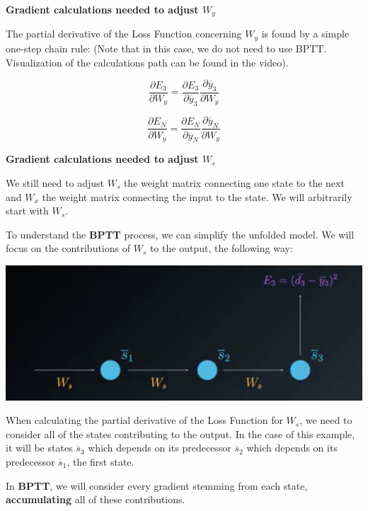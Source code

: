 \textbf{Gradient calculations needed to adjust \(W_y\)} \newline

The partial derivative of the Loss Function concerning \(W_y\) is found by a simple one-step chain rule: (Note that in this case, we do not need to use BPTT. Visualization of the calculations path can be found in the video).

\[\frac{\partial E_3}{\partial W_y} = \frac{\partial E_3}{\partial \overline{y}_3} \frac{\partial \overline{y}_3}{\partial W_y}\]

\[\frac{\partial E_N}{\partial W_y} = \frac{\partial E_N}{\partial \overline{y}_N} \frac{\partial \overline{y}_N}{\partial W_y}\]

\textbf{Gradient calculations needed to adjust \(W_s\)} \newline

We still need to adjust \(W_s\) the weight matrix connecting one state to the next and \(W_x\) the weight matrix connecting the input to the state. We will arbitrarily start with \(W_s\). \newline

To understand the \textbf{BPTT} process, we can simplify the unfolded model. We will focus on the contributions of \(W_s\) to the output, the following way:

\includegraphics[width=0.5\linewidth]{img//rnn//intro/screen-shot-2017-11-27-at-2.00.15-pm.png}

When calculating the partial derivative of the Loss Function for \(W_s\), we need to consider all of the states contributing to the output. In the case of this example, it will be states \(\overline{s}_3\) which depends on its predecessor \(\overline{s}_2\) which depends on its predecessor \(\overline{s}_1\), the first state. \newline

In \textbf{BPTT}, we will consider every gradient stemming from each state, \textbf{accumulating} all of these contributions. \newline


